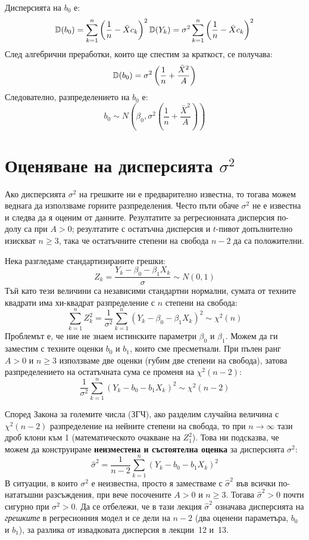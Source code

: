 Дисперсията на $b_0$ е:
\[
\mathbb{D}(b_0) = \sum_{k=1}^n \left( \frac{1}{n} - \bar{X} c_k \right)^2 \mathbb{D}(Y_k) = \sigma^2 \sum_{k=1}^n \left( \frac{1}{n} - \bar{X} c_k \right)^2
\]
След алгебрични преработки, които ще спестим за краткост, се получава:
\[
\mathbb{D}(b_0) = \sigma^2 \left( \frac{1}{n} + \frac{\bar{X}^2}{A} \right)
\]
Следователно, разпределението на $b_0$ е:
\[
b_0 \sim N\left(\beta_0, \sigma^2 \left(\frac{1}{n} + \frac{\bar{X}^2}{A}\right)\right)
\]

\section{Оценяване на дисперсията $\sigma^2$}

Ако дисперсията $\sigma^2$ на грешките ни е предварително известна, то тогава можем веднага да използваме горните разпределения. Често пъти обаче $\sigma^2$ не е известна и следва да я оценим от данните. Резултатите за регресионната дисперсия по-долу са при $A>0$; резултатите с остатъчна дисперсия и $t$-пивот допълнително изискват $n\geq 3$, така че остатъчните степени на свобода $n-2$ да са положителни.

Нека разгледаме стандартизираните грешки:
\[
Z_k = \frac{Y_k - \beta_0 - \beta_1 X_k}{\sigma} \sim N(0, 1)
\]
Тъй като тези величини са независими стандартни нормални, сумата от техните квадрати има хи-квадрат разпределение с $n$ степени на свобода:
\[
\sum_{k=1}^n Z_k^2 = \frac{1}{\sigma^2} \sum_{k=1}^n (Y_k - \beta_0 - \beta_1 X_k)^2 \sim \chi^2(n)
\]
Проблемът е, че ние не знаем истинските параметри $\beta_0$ и $\beta_1$. Можем да ги заместим с техните оценки $b_0$ и $b_1$, които сме пресметнали. При пълен ранг $A>0$ и $n\geq 3$ използваме две оценки (губим две степени на свобода), затова разпределението на остатъчната сума се променя на $\chi^2(n-2)$:
\[
\frac{1}{\sigma^2} \sum_{k=1}^n (Y_k - b_0 - b_1 X_k)^2 \sim \chi^2(n-2)
\]

Според Закона за големите числа (ЗГЧ), ако разделим случайна величина с $\chi^2(n-2)$ разпределение на нейните степени на свобода, то при $n \to \infty$ тази дроб клони към 1 (математическото очакване на $Z_1^2$). Това ни подсказва, че можем да конструираме \textbf{неизместена и състоятелна оценка} за дисперсията $\sigma^2$:
\[
\hat{\sigma}^2 = \frac{1}{n-2} \sum_{k=1}^n (Y_k - b_0 - b_1 X_k)^2
\]
В ситуации, в които $\sigma^2$ е неизвестна, просто я заместваме с $\hat{\sigma}^2$ във всички по-нататъшни разсъждения, при вече посочените $A>0$ и $n\geq 3$. Тогава $\hat{\sigma}^2>0$ почти сигурно при $\sigma^2>0$. Да се отбележи, че в тази лекция $\hat{\sigma}^2$ означава дисперсията на \emph{грешките} в регресионния модел и се дели на $n-2$ (два оценени параметъра, $b_0$ и $b_1$), за разлика от извадковата дисперсия в лекции~12 и~13.

